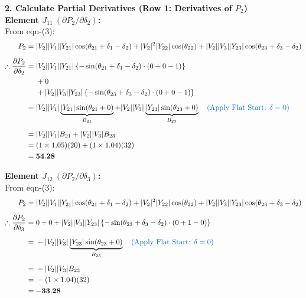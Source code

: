 \documentclass[11pt]{article}
\begin{document}
\begin{stepbox}
\vspace{0.3cm}
\textbf{2. Calculate Partial Derivatives (Row 1: Derivatives of $P_2$)}\\
%
\noindent \textbf{Element $J_{11} \ (\partial P_2 / \partial \delta_2)$:} \\
From eqn-(3):
\begin{align*}
    P_2 =\;& |V_2||V_1||Y_{21}| \cos(\theta_{21} + \delta_1 - \delta_2) + |V_2|^2|Y_{22}| \cos(\theta_{22}) + |V_2||V_3||Y_{23}| \cos(\theta_{23} + \delta_3 - \delta_2) \\[0.2cm]
    \therefore \frac{\partial P_2}{\partial \delta_2} =\;& |V_2||V_1||Y_{21}| \left\{-\sin(\theta_{21} + \delta_1 - \delta_2) \cdot (0 + 0 - 1)\right\} \\
    & + 0 \\
    & + |V_2||V_3||Y_{23}| \left\{-\sin(\theta_{23} + \delta_3 - \delta_2) \cdot (0 + 0 - 1)\right\} \\[0.2cm]
    =\;& |V_2||V_1|\underbrace{|Y_{21}|\sin(\theta_{21} + 0)}_{B_{21}} + |V_2||V_3|\underbrace{|Y_{23}|\sin(\theta_{23} + 0)}_{B_{23}} \quad \text{\textcolor{mainblue}{(Apply Flat Start: $\delta=0$)}} \\[0.2cm]
    =\;& |V_2||V_1|B_{21} + |V_2||V_3|B_{23} \\
    =\;& (1 \times 1.05)(20) + (1 \times 1.04)(32) \\
    =\;& \mathbf{54.28}
\end{align*}

\vspace{0.3cm}
\noindent \textbf{Element $J_{12} \ (\partial P_2 / \partial \delta_3)$:} \\
From eqn-(3):
\begin{align*}
    P_2 =\;& |V_2||V_1||Y_{21}| \cos(\theta_{21} + \delta_1 - \delta_2) + |V_2|^2|Y_{22}| \cos(\theta_{22}) + |V_2||V_3||Y_{23}| \cos(\theta_{23} + \delta_3 - \delta_2) \\[0.2cm]
    \therefore \frac{\partial P_2}{\partial \delta_3} =\;& 0 + 0 + |V_2||V_3||Y_{23}| \left\{-\sin(\theta_{23} + \delta_3 - \delta_2) \cdot (0 + 1 - 0)\right\} \\[0.2cm]
    =\;& -|V_2||V_3|\underbrace{|Y_{23}|\sin(\theta_{23} + 0)}_{B_{23}} \quad \text{\textcolor{mainblue}{(Apply Flat Start: $\delta=0$)}} \\[0.2cm]
    =\;& -|V_2||V_3|B_{23} \\
    =\;& -(1 \times 1.04)(32) \\
    =\;& \mathbf{-33.28}
\end{align*}


\end{stepbox}
\end{document}

